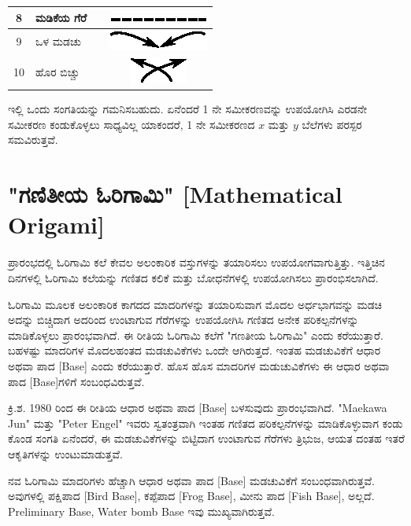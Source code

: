 \begin{longtable}[l]{|c|l|l|c|}
\hline
8 & ಮಡಿಕೆಯ ಗೆರೆ & & {\includegraphics[scale=.98]{src/figure/chap1/fig1a_8.eps}}\\[0.1cm]
\hline
9 & ಒಳ ಮಡಚು & & {\includegraphics[scale=.98]{src/figure/chap1/fig1a_10.eps}}\\[0.1cm]
\hline
10 & ಹೊರ ಬಿಚ್ಚು & & {\includegraphics[scale=.98]{src/figure/chap1/fig1a_11.eps}}\\[0.1cm]
\hline
\end{longtable}

\smallskip

ಇಲ್ಲಿ ಒಂದು ಸಂಗತಿಯನ್ನು ಗಮನಿಸಬಹುದು. ಏನೆಂದರೆ 1 ನೇ ಸಮೀಕರಣವನ್ನು ಉಪಯೋಗಿಸಿ ಎರಡನೇ ಸಮೀಕರಣ ಕಂಡುಕೊಳ್ಳಲು ಸಾಧ್ಯವಿಲ್ಲ ಯಾಕಂದರೆ, 1 ನೇ ಸಮೀಕರಣದ $x$ ಮತ್ತು $y$  ಬೆಲೆಗಳು ಪರಸ್ಪರ ಸಮವಿರುತ್ತವೆ. 


\section{"ಗಣಿತೀಯ ಓರಿಗಾಮಿ" [Mathematical Origami]}\label{sec1.4}%
ಪ್ರಾರಂಭದಲ್ಲಿ ಓರಿಗಾಮಿ ಕಲೆ ಕೇವಲ ಅಲಂಕಾರಿಕ ವಸ್ತುಗಳನ್ನು ತಯಾರಿಸಲು ಉಪಯೋಗವಾಗುತ್ತಿತ್ತು. ಇತ್ತಿಚಿನ ದಿನಗಳಲ್ಲಿ ಓರಿಗಾಮಿ ಕಲೆಯನ್ನು ಗಣಿತದ ಕಲಿಕೆ ಮತ್ತು ಬೋಧನೆಗಳಲ್ಲಿ ಉಪಯೋಗಿಸಲು ಪ್ರಾರಂಭಿಸಲಾಗಿದೆ. 

\smallskip

ಓರಿಗಾಮಿ ಮೂಲಕ ಅಲಂಕಾರಿಕ ಕಾಗದದ ಮಾದರಿಗಳನ್ನು ತಯಾರಿಸುವಾಗ ಮೊದಲ ಅರ್ಧಭಾಗವನ್ನು ಮಡಚಿ ಅದನ್ನು ಬಿಚ್ಚಿದಾಗ ಅದರಿಂದ ಉಂಟಾಗುವ ಗೆರೆಗಳನ್ನು ಉಪಯೋಗಿಸಿ ಗಣಿತದ ಅನೇಕ ಪರಿಕಲ್ಪನೆಗಳನ್ನು ಮಾಡಿಕೊಳ್ಳಲು ಪ್ರಾರಂಭವಾಗಿದೆ. ಈ ರೀತಿಯ ಓರಿಗಾಮಿ ಕಲೆಗೆ "ಗಣತೀಯ ಓರಿಗಾಮಿ" ಎಂದು ಕರೆಯುತ್ತಾರೆ. ಬಹಳಷ್ಟು ಮಾದರಿಗಳ ಮೊದಲಹಂತದ ಮಡಚುವಿಕೆಗಳು ಒಂದೇ ಆಗಿರುತ್ತದೆ. ಇಂತಹ ಮಡಚುವಿಕೆಗೆ ಆಧಾರ ಅಥವಾ ಪಾದ [Base] ಎಂದು ಕರೆಯುತ್ತಾರೆ. ಹೊಸ ಹೊಸ ಮಾದರಿಗಳ ಮಡುಚುವಿಕೆಗಳು ಈ ಆಧಾರ ಅಥವಾ ಪಾದ [Base]ಗಳಿಗೆ ಸಂಬಂಧವಿರುತ್ತವೆ.

\smallskip

ಕ್ರಿ.ಶ. 1980 ರಿಂದ ಈ ರೀತಿಯ ಆಧಾರ ಅಥವಾ ಪಾದ [Base] ಬಳಸುವುದು ಪ್ರಾರಂಭವಾಗಿದೆ. "Maekawa Jun" ಮತ್ತು "Peter Engel" ಇವರು ಸ್ವತಂತ್ರವಾಗಿ ಇಂತಹ ಗಣಿತದ ಪರಿಕಲ್ಪನೆಗಳನ್ನು ಮಾಡಿಕೊಳ್ಳುವಾಗ ಕಂಡು ಕೊಂಡ ಸಂಗತಿ ಏನೆಂದರೆ, ಈ ಮಡಚುವಿಕೆಗಳನ್ನು ಬಿಟ್ಟಿದಾಗ ಉಂಟಾಗುವ ಗೆರೆಗಳು ತ್ರಿಭುಜ, ಆಯತ ದಂತಹ ಇತರೆ ಆಕೃತಿಗಳನ್ನು ಉಂಟುಮಾಡುತ್ತವೆ. 
\smallskip

ನವ ಓರಿಗಾಮಿ ಮಾದರಿಗಳು ಹೆಚ್ಚಾಗಿ ಆಧಾರ ಅಥವಾ ಪಾದ [Base] ಮಡಚುವಿಕೆಗೆ ಸಂಬಂಧವಾಗಿರುತ್ತವೆ. ಅವುಗಳಲ್ಲಿ ಪಕ್ಷಿಪಾದ [Bird Base], ಕಪ್ಪೆಪಾದ [Frog Base], ಮೀನು ಪಾದ [Fish Base], ಅಲ್ಲದೆ. Preliminary Base, Water bomb Base ಇವು ಮುಖ್ಯವಾಗಿರುತ್ತವೆ. 

